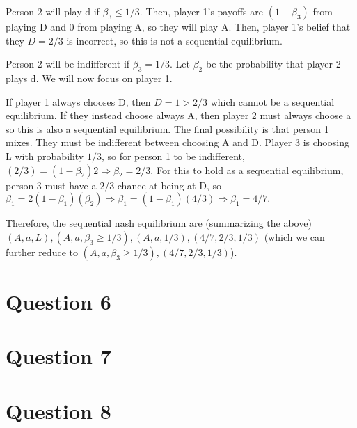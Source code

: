 \documentclass[11pt]{article} %
\begin{document}
Person 2 will play d if $\beta_3\leq 1/3.$ Then, player 1's payoffs are $(1-\beta_3)$ from playing D and 0 from playing A, so they will play A. Then, player 1's belief that they $D=2/3$ is incorrect, so this is not a sequential equilibrium.

Person 2 will be indifferent if $\beta_3 = 1/3$. Let $\beta_2$ be the probability that player 2 plays d. We will now focus on player 1.

If player 1 always chooses D, then $D=1>2/3$ which cannot be a sequential equilibrium. If they instead choose always A, then player 2 must always choose a so this is also a sequential equilibrium. The final possibility is that person 1 mixes. They must be indifferent between choosing A and D. Player 3 is choosing L with probability $1/3$, so for person 1 to be indifferent, $(2/3) =  (1-\beta_2)2 \Rightarrow \beta_2 = 2/3$. For this to hold as a sequential equilibrium, person 3 must have a $2/3$ chance at being at D, so $\beta_1 = 2(1-\beta_1)(\beta_2) \Rightarrow \beta_1 = (1-\beta_1)(4/3) \Rightarrow \beta_1 = 4/7.$

Therefore, the sequential nash equilibrium are (summarizing the above) $(A,a,L),(A,a,\beta_3\geq1/3),(A,a,1/3),(4/7,2/3,1/3)$ (which we can further reduce to $(A,a,\beta_3\geq1/3),(4/7,2/3,1/3)$).
\section{Question 6}
\section{Question 7}
\section{Question 8}
\end{document}
